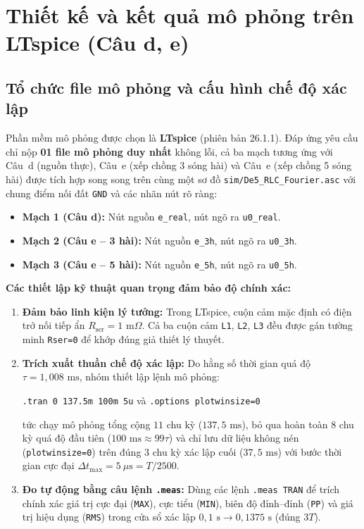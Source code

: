 \section{Thiết kế và kết quả mô phỏng trên LTspice (Câu d, e)}

\subsection{Tổ chức file mô phỏng và cấu hình chế độ xác lập}

Phần mềm mô phỏng được chọn là \textbf{LTspice} (phiên bản 26.1.1). Đáp ứng yêu cầu chỉ nộp \textbf{01 file mô phỏng duy nhất} không lỗi, cả ba mạch tương ứng với Câu~d (nguồn thực), Câu~e (xếp chồng 3 sóng hài) và Câu~e (xếp chồng 5 sóng hài) được tích hợp song song trên cùng một sơ đồ \texttt{sim/De5\_RLC\_Fourier.asc} với chung điểm nối đất \texttt{GND} và các nhãn nút rõ ràng:
\begin{itemize}
    \item \textbf{Mạch 1 (Câu d):} Nút nguồn \texttt{e\_real}, nút ngõ ra \texttt{u0\_real}.
    \item \textbf{Mạch 2 (Câu e -- 3 hài):} Nút nguồn \texttt{e\_3h}, nút ngõ ra \texttt{u0\_3h}.
    \item \textbf{Mạch 3 (Câu e -- 5 hài):} Nút nguồn \texttt{e\_5h}, nút ngõ ra \texttt{u0\_5h}.
\end{itemize}

\textbf{Các thiết lập kỹ thuật quan trọng đảm bảo độ chính xác:}
\begin{enumerate}
    \item \textbf{Đảm bảo linh kiện lý tưởng:} Trong LTspice, cuộn cảm mặc định có điện trở nối tiếp ẩn $R_{\text{ser}} = 1\text{ m}\Omega$. Cả ba cuộn cảm \texttt{L1}, \texttt{L2}, \texttt{L3} đều được gán tường minh \texttt{Rser=0} để khớp đúng giả thiết lý thuyết.
    \item \textbf{Trích xuất thuần chế độ xác lập:} Do hằng số thời gian quá độ $\tau = 1{,}008\text{ ms}$, nhóm thiết lập lệnh mô phỏng:
    \begin{center}
        \texttt{.tran 0 137.5m 100m 5u} \qquad và \qquad \texttt{.options plotwinsize=0}
    \end{center}
    tức chạy mô phỏng tổng cộng $11$ chu kỳ ($137{,}5\text{ ms}$), bỏ qua hoàn toàn $8$ chu kỳ quá độ đầu tiên ($100\text{ ms} \approx 99\tau$) và chỉ lưu dữ liệu không nén (\texttt{plotwinsize=0}) trên đúng $3$ chu kỳ xác lập cuối ($37{,}5\text{ ms}$) với bước thời gian cực đại $\Delta t_{\max} = 5\ \mu\text{s} = T/2500$.
    \item \textbf{Đo tự động bằng câu lệnh \texttt{.meas}:} Dùng các lệnh \texttt{.meas TRAN} để trích chính xác giá trị cực đại (\texttt{MAX}), cực tiểu (\texttt{MIN}), biên độ đỉnh--đỉnh (\texttt{PP}) và giá trị hiệu dụng (\texttt{RMS}) trong cửa sổ xác lập $0{,}1\text{ s} \to 0{,}1375\text{ s}$ (đúng $3T$).
\end{enumerate}

